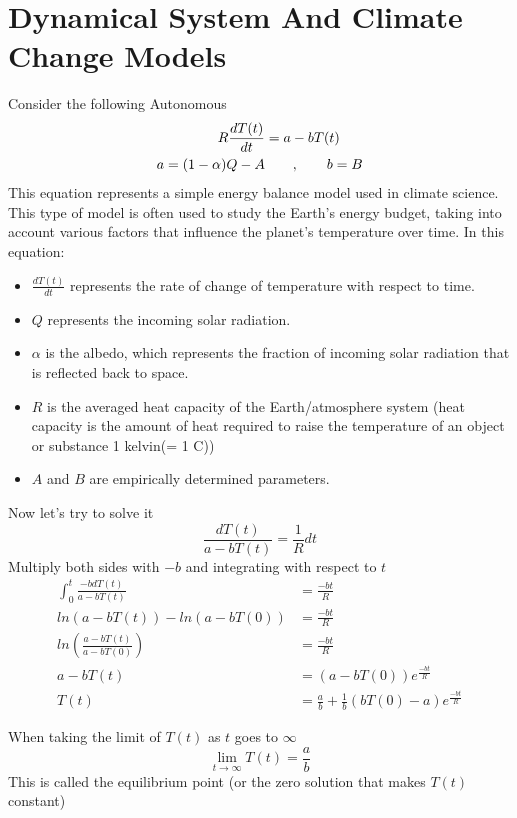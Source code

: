 \documentclass[]{article}
\begin{document}
\setcounter{equation}{0}
\newpage

\section{Dynamical System And Climate Change Models}

Consider the following Autonomous
\begin{align*}
    R \frac{dT(t)}{dt} & = a - bT(t)
    \\
    a = (1-\alpha)Q-A  & \quad\quad,\quad\quad b = B
\end{align*}
This equation represents a simple energy balance model used in climate science.
This type of model is often used to study the Earth's energy budget,
taking into account various factors that influence the planet's temperature over time.
In this equation:
\begin{itemize}
    \item $\displaystyle \frac{dT(t)}{dt}$ represents the rate of change of temperature with respect to time.
    \item $Q$ represents the incoming solar radiation.
    \item $\alpha$ is the albedo, which represents the fraction of incoming solar radiation that is reflected back to space.
    \item $R$ is the averaged heat capacity of the Earth/atmosphere
          system (heat capacity is the amount of heat required to raise the temperature of an object or substance 1 kelvin(= 1 C))
    \item $A$ and $B$ are empirically determined parameters.
\end{itemize}
Now let's try to solve it
\[
    \frac{dT(t)}{a - bT(t)} = \frac{1}{R} dt
\]
Multiply both sides with $-b$ and integrating with respect to $t$
\begin{align*}
    \int_{0}^{t} \frac{-b dT(t)}{a - bT(t)}     & = \frac{-bt}{R}
    \\
    ln(a - bT(t)) - ln(a - bT(0))               & = \frac{-bt}{R}
    \\
    ln \left(\frac{a - bT(t)}{a - bT(0)}\right) & = \frac{-bt}{R}
    \\
    a - bT(t)                                   & = (a - bT(0))e^{\frac{-bt}{R}}
    \\
    T(t)                                        & = \frac{a}{b} + \frac{1}{b}(bT(0)-a)e^{\frac{-bt}{R}}
\end{align*}

When taking the limit of $T(t)$ as $t$ goes to $\infty$
\[
    \lim_{t \to \infty} T(t) = \frac{a}{b}
\]
This is called the equilibrium point (or the zero solution that makes $T(t)$ constant)
\end{document}

